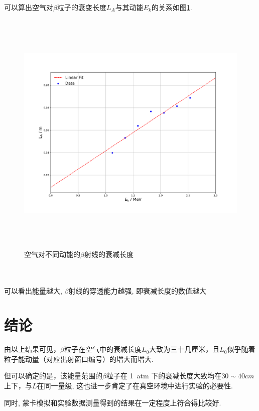 \documentclass[a4paper]{article}
\begin{document}
可以算出空气对$\beta$粒子的衰变长度$L_A$与其动能$E_k$的关系如图\ref{fig:fig12}. 
\begin{figure}[ht]
 \centering
 \includegraphics[height=12cm, width=16cm]{images/phyex6_fig3.pdf}
 \caption{空气对不同动能的$\beta$射线的衰减长度}
 \label{fig:fig12}
\end{figure}\\\\
可以看出能量越大, $\beta$射线的穿透能力越强, 即衰减长度的数值越大

\newpage
\section{结论}\label{conclusions}
由以上结果可见，$\beta$粒子在空气中的衰减长度$L_0$大致为三十几厘米，且$L_0$似乎随着粒子能动量（对应出射窗口编号）的增大而增大.

但可以确定的是，该能量范围的$\beta$粒子在 \SI{1}{atm} 下的衰减长度大致均在$30\sim40cm$上下，与$L$在同一量级, 这也进一步肯定了在真空环境中进行实验的必要性.

同时, 蒙卡模拟和实验数据测量得到的结果在一定程度上符合得比较好.
\end{document}
